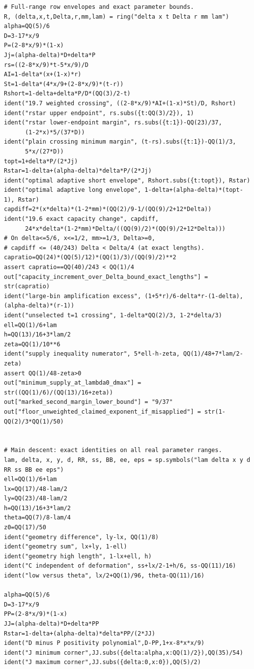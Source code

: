 \documentclass[12pt]{article}
\begin{document}
\begin{verbatim}
# Full-range row envelopes and exact parameter bounds.
R, (delta,x,t,Delta,r,mm,lam) = ring("delta x t Delta r mm lam")
alpha=QQ(5)/6
D=3-17*x/9
P=(2-8*x/9)*(1-x)
Jj=(alpha-delta)*D+delta*P
rs=((2-8*x/9)*t-5*x/9)/D
AI=1-delta*(x+(1-x)*r)
St=1-delta*(4*x/9+(2-8*x/9)*(t-r))
Rshort=1-delta+delta*P/D*(QQ(3)/2-t)
ident("19.7 weighted crossing", ((2-8*x/9)*AI+(1-x)*St)/D, Rshort)
ident("rstar upper endpoint", rs.subs({t:QQ(3)/2}), 1)
ident("rstar lower-endpoint margin", rs.subs({t:1})-QQ(23)/37,
      (1-2*x)*5/(37*D))
ident("plain crossing minimum margin", (t-rs).subs({t:1})-QQ(1)/3,
      5*x/(27*D))
topt=1+delta*P/(2*Jj)
Rstar=1-delta+(alpha-delta)*delta*P/(2*Jj)
ident("optimal adaptive short envelope", Rshort.subs({t:topt}), Rstar)
ident("optimal adaptive long envelope", 1-delta+(alpha-delta)*(topt-1), Rstar)
capdiff=2*(x*delta)*(1-2*mm)*(QQ(2)/9-1/(QQ(9)/2+12*Delta))
ident("19.6 exact capacity change", capdiff,
      24*x*delta*(1-2*mm)*Delta/((QQ(9)/2)*(QQ(9)/2+12*Delta)))
# On delta<=5/6, x<=1/2, mm>=1/3, Delta>=0,
# capdiff <= (40/243) Delta < Delta/4 (at exact lengths).
capratio=QQ(24)*(QQ(5)/12)*(QQ(1)/3)/(QQ(9)/2)**2
assert capratio==QQ(40)/243 < QQ(1)/4
out["capacity_increment_over_Delta_bound_exact_lengths"] = str(capratio)
ident("large-bin amplification excess", (1+5*r)/6-delta*r-(1-delta), (alpha-delta)*(r-1))
ident("unselected t=1 crossing", 1-delta*QQ(2)/3, 1-2*delta/3)
ell=QQ(1)/6+lam
h=QQ(13)/16+3*lam/2
zeta=QQ(1)/10**6
ident("supply inequality numerator", 5*ell-h-zeta, QQ(1)/48+7*lam/2-zeta)
assert QQ(1)/48-zeta>0
out["minimum_supply_at_lambda0_dmax"] = str((QQ(1)/6)/(QQ(13)/16+zeta))
out["marked_second_margin_lower_bound"] = "9/37"
out["floor_unweighted_claimed_exponent_if_misapplied"] = str(1-QQ(2)/3*QQ(1)/50)


# Main descent: exact identities on all real parameter ranges.
lam, delta, x, y, d, RR, ss, BB, ee, eps = sp.symbols("lam delta x y d RR ss BB ee eps")
ell=QQ(1)/6+lam
lx=QQ(17)/48-lam/2
ly=QQ(23)/48-lam/2
h=QQ(13)/16+3*lam/2
theta=QQ(7)/8-lam/4
z0=QQ(17)/50
ident("geometry difference", ly-lx, QQ(1)/8)
ident("geometry sum", lx+ly, 1-ell)
ident("geometry high length", 1-lx+ell, h)
ident("C independent of deformation", ss+lx/2-1+h/6, ss-QQ(11)/16)
ident("low versus theta", lx/2+QQ(1)/96, theta-QQ(11)/16)

alpha=QQ(5)/6
D=3-17*x/9
PP=(2-8*x/9)*(1-x)
JJ=(alpha-delta)*D+delta*PP
Rstar=1-delta+(alpha-delta)*delta*PP/(2*JJ)
ident("D minus P positivity polynomial",D-PP,1+x-8*x*x/9)
ident("J minimum corner",JJ.subs({delta:alpha,x:QQ(1)/2}),QQ(35)/54)
ident("J maximum corner",JJ.subs({delta:0,x:0}),QQ(5)/2)


\end{verbatim}
\end{document}
